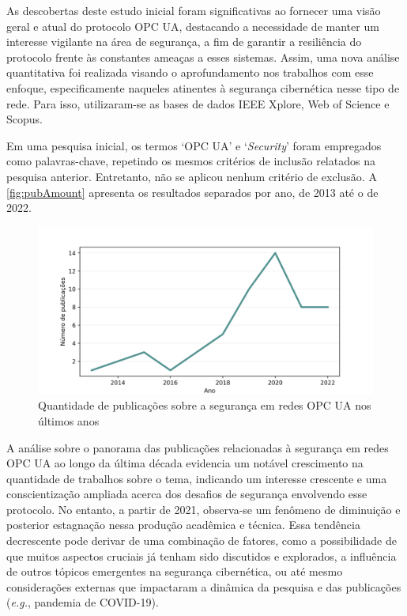     As descobertas deste estudo inicial foram significativas ao fornecer uma visão geral e atual do protocolo OPC UA, destacando a necessidade de manter um interesse vigilante na área de segurança, a fim de garantir a resiliência do protocolo frente às constantes ameaças a esses sistemas. Assim, uma nova análise quantitativa foi realizada visando o aprofundamento nos trabalhos com esse enfoque, especificamente naqueles atinentes à segurança cibernética nesse tipo de rede. Para isso, utilizaram-se as bases de dados IEEE Xplore, Web of Science e Scopus.

    Em uma pesquisa inicial, os termos `OPC UA' e `\textit{Security}' foram empregados como palavras-chave, repetindo os mesmos critérios de inclusão relatados na pesquisa anterior. Entretanto, não se aplicou nenhum critério de exclusão. A \autoref{fig:pubAmount} apresenta os resultados separados por ano, de 2013 até o de 2022.

    \begin{figure}[htbp]
        \caption{Quantidade de publicações sobre a segurança em redes OPC UA nos últimos anos}
        \label{fig:pubAmount}
        \begin{center}
            \includegraphics[width=0.7\linewidth]{USPSC-img/pubAmount1.png}
        \end{center}
    \end{figure}

    A análise sobre o panorama das publicações relacionadas à segurança em redes OPC UA ao longo da última década evidencia um notável crescimento na quantidade de trabalhos sobre o tema, indicando um interesse crescente e uma conscientização ampliada acerca dos desafios de segurança envolvendo esse protocolo. No entanto, a partir de 2021, observa-se um fenômeno de diminuição e posterior estagnação nessa produção acadêmica e técnica. Essa tendência decrescente pode derivar de uma combinação de fatores, como a possibilidade de que muitos aspectos cruciais já tenham sido discutidos e explorados, a influência de outros tópicos emergentes na segurança cibernética, ou até mesmo considerações externas que impactaram a dinâmica da pesquisa e das publicações (\textit{e.g.}, pandemia de COVID-19).

